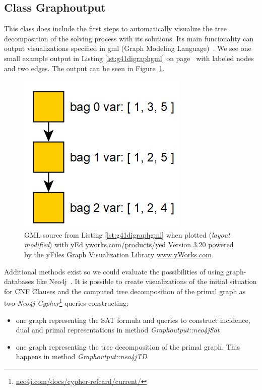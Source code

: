 \documentclass[a4paper, 12pt, bibliography=totoc]{scrartcl}
\begin{document}
\subsection{Class Graphoutput}\label{sec:chagraphoutput}
This class does include the first steps to automatically visualize the tree decomposition of the solving process with its solutions.
Its main funcionality can output visualizations specified in gml (Graph Modeling Language)~\cite{Himsolt2010GMLAP}. We see one small example output in Listing \ref{lst:g41digraphgml} on page~\pageref{lst:g41digraphgml} with labeled nodes and two edges. The output can be seen in Figure~\ref{fig:gmlexamplepic}.

\begin{figure}[h]
	\centering
	\includegraphics[]{images/gmlexamplepic.png}
	\caption[GML example plotted with yEd]{GML source from Listing \ref{lst:g41digraphgml} when plotted (\textit{layout modified}) with yEd {\url{yworks.com/products/yed} Version 3.20 powered by the yFiles Graph Visualization Library \url{www.yWorks.com}} }
	\label{fig:gmlexamplepic}
\end{figure}
Additional methods exist so we could evaluate the possibilities of using graph-databases like Neo4j~\cite{graphdatabases}.
It is possible to create visualizations of the initial situation for CNF Clauses and the computed tree decomposition of the primal graph as two \textit{Neo4j Cypher}\footnote{\url{neo4j.com/docs/cypher-refcard/current/}} queries constructing:
\begin{itemize}[label=-]
	\item one graph representing the SAT formula and queries to construct incidence, dual and primal representations in method \textit{Graphoutput::neo4jSat}
	\item one graph representing the tree decomposition of the primal graph. This happens in method \textit{Graphoutput::neo4jTD}.
\end{itemize}
\end{document}
